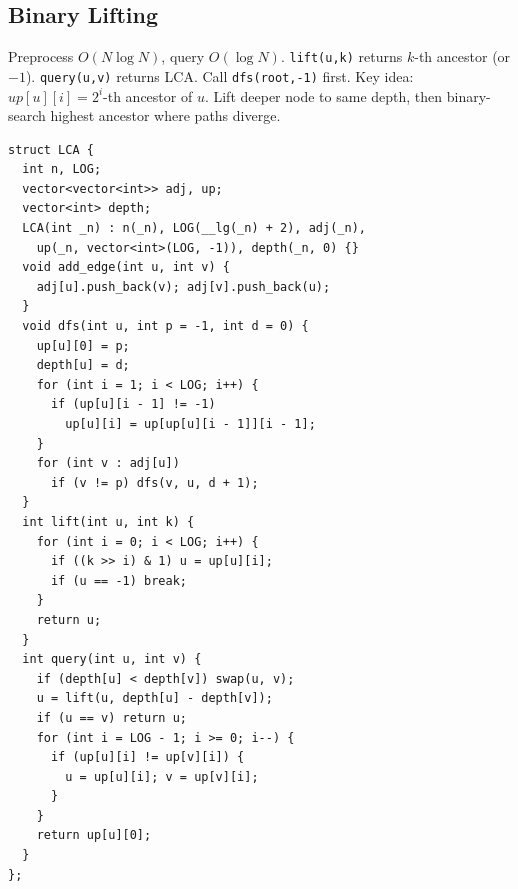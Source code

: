\subsection{Binary Lifting}
Preprocess $O(N \log N)$, query $O(\log N)$. \texttt{lift(u,k)} returns $k$-th ancestor (or $-1$). \texttt{query(u,v)} returns LCA. Call \texttt{dfs(root,-1)} first. Key idea: $up[u][i] = 2^i$-th ancestor of $u$. Lift deeper node to same depth, then binary-search highest ancestor where paths diverge.
\begin{verbatim}
struct LCA {
  int n, LOG;
  vector<vector<int>> adj, up;
  vector<int> depth;
  LCA(int _n) : n(_n), LOG(__lg(_n) + 2), adj(_n),
    up(_n, vector<int>(LOG, -1)), depth(_n, 0) {}
  void add_edge(int u, int v) {
    adj[u].push_back(v); adj[v].push_back(u);
  }
  void dfs(int u, int p = -1, int d = 0) {
    up[u][0] = p;
    depth[u] = d;
    for (int i = 1; i < LOG; i++) {
      if (up[u][i - 1] != -1)
        up[u][i] = up[up[u][i - 1]][i - 1];
    }
    for (int v : adj[u])
      if (v != p) dfs(v, u, d + 1);
  }
  int lift(int u, int k) {
    for (int i = 0; i < LOG; i++) {
      if ((k >> i) & 1) u = up[u][i];
      if (u == -1) break;
    }
    return u;
  }
  int query(int u, int v) {
    if (depth[u] < depth[v]) swap(u, v);
    u = lift(u, depth[u] - depth[v]);
    if (u == v) return u;
    for (int i = LOG - 1; i >= 0; i--) {
      if (up[u][i] != up[v][i]) {
        u = up[u][i]; v = up[v][i];
      }
    }
    return up[u][0];
  }
};
\end{verbatim}
